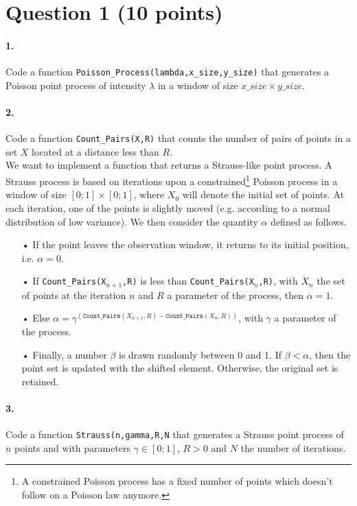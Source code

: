 \documentclass{article}
\begin{document}
\section{Question 1 (10 points)}

\paragraph{1.} Code a function \texttt{Poisson\_Process(lambda,x\_size,y\_size)} that generates a Poisson point process of intensity $\lambda$ in a window of size $x\_size\times y\_size$.

\paragraph{2.} Code a function \texttt{Count\_Pairs(X,R)} that counts the number of pairs of points in a set $X$ located at a distance less than $R$.\\

We want to implement a function that returns a Strauss-like point process. A Strauss process is based on iterations upon a constrained\footnote{A constrained Poisson process has a fixed number of points which doesn't follow on a Poisson law anymore.} Poisson process in a window of size $[0;1]\times[0;1]$, where $X_0$ will denote the initial set of points. At each iteration, one of the points is slightly moved (e.g. according to a normal distribution of low variance). We then consider the quantity $\alpha$ defined as follows.

\begin{enumerate}
\item[•] If the point leaves the observation window, it returns to its initial position, i.e. $\alpha=0$.
\item[•] If \texttt{Count\_Pairs(X$_{n+1}$,R)} is less than \texttt{Count\_Pairs(X$_{n}$,R)}, with $X_n$ the set of points at the iteration $n$ and $R$ a parameter of the process, then $\alpha=1$.
\item[•] Else $\alpha =\gamma^{\left(\texttt{Count\_Pairs}(X_{n+1},R)-\texttt{Count\_Pairs}(X_{n},R)\right)}$, with $\gamma$ a parameter of the process.
\item[•] Finally, a number $\beta$ is drawn randomly between 0 and 1. If $\beta<\alpha$, then the point set is updated with the shifted element. Otherwise, the original set is retained.
\end{enumerate}

\paragraph{3.} Code a function \texttt{Strauss(n,gamma,R,N} that generates a Strauss point process of $n$ points and with parameters $\gamma\in[0;1]$, $R>0$ and $N$ the number of iterations.
\end{document}
